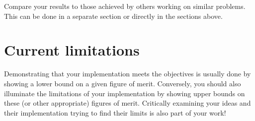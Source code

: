 {	Compare your results to those achieved by others working on similar problems.
	This can be done in a separate section or directly in the sections above.

	\section{Current limitations}

	Demonstrating that your implementation meets the objectives is usually done by showing a lower bound on a given figure of merit.
	Conversely, you should also illuminate the limitations of your implementation by showing upper bounds on these (or other appropriate) figures of merit.
	Critically examining your ideas and their implementation trying to find their limits is also part of your work!
}
